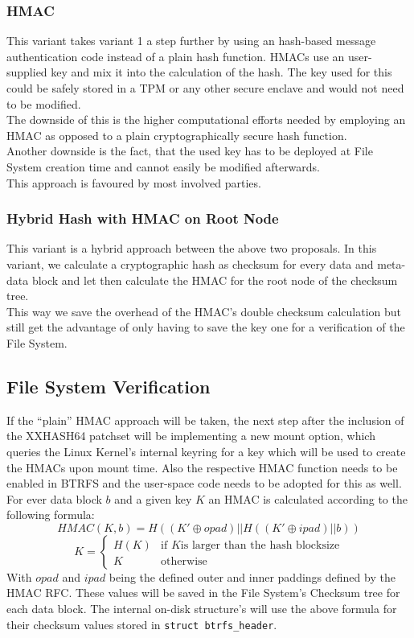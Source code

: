 \documentclass[10pt]{article}
\begin{document}
\subsubsection{HMAC}
This variant takes variant 1 a step further by using an hash-based message
authentication code \cite{HMAC} instead of a plain hash function. HMACs use an
user-supplied key and mix it into the calculation of the hash. The key used
for this could be safely stored in a TPM or any other secure enclave and would
not need to be modified.\\
The downside of this is the higher computational efforts needed by employing
an HMAC as opposed to a plain cryptographically secure hash function.\\
Another downside is the fact, that the used key has to be deployed at
File System creation time and cannot easily be modified afterwards.\\
This approach is favoured by most involved parties.

\subsubsection{Hybrid Hash with HMAC on Root Node}
This variant is a hybrid approach between the above two proposals. In this
variant, we calculate a cryptographic hash as checksum for every data and
meta-data block and let then calculate the HMAC for the root node of the
checksum tree.\\ This way we save the overhead of the HMAC's double checksum
calculation but still get the advantage of only having to save the key one for
a verification of the File System.

\subsection{File System Verification}
If the ``plain'' HMAC approach will be taken, the next step after the
inclusion of the XXHASH64 patchset will be implementing a new mount option,
which queries the Linux Kernel's internal keyring for a key which will be used
to create the HMACs upon mount time. Also the respective HMAC function needs
to be enabled in BTRFS and the user-space code needs to be adopted for this as
well.\\

For ever data block $b$ and a given key $K$ an HMAC is calculated according to
the following formula:
\[
HMAC(K,b) = H((K' \oplus opad) || H((K' \oplus ipad)|| b ))
\]
\[
K =
\begin{cases}
	H(K) & \text{if } K \text{is larger than the hash blocksize} \\
	K & \text{otherwise}
\end{cases}
\]
With $opad$ and $ipad$ being the defined outer and inner paddings defined by
the HMAC RFC. These values will be saved in the File System's Checksum tree
for each data block. The internal on-disk structure's will use the above
formula for their checksum values stored in \texttt{struct btrfs\_header}.\\
\end{document}
